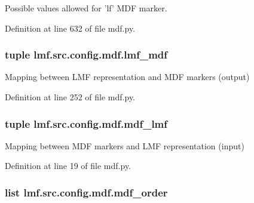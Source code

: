 Possible values allowed for 'lf' M\+D\+F marker. 



Definition at line 632 of file mdf.\+py.

\hypertarget{namespacelmf_1_1src_1_1config_1_1mdf_a78d8f1444783c1b86cbbd91f49a0cd4f}{
\subsubsection[{lmf\+\_\+mdf}]{\setlength{\rightskip}{0pt plus 5cm}tuple lmf.\+src.\+config.\+mdf.\+lmf\+\_\+mdf}}\label{namespacelmf_1_1src_1_1config_1_1mdf_a78d8f1444783c1b86cbbd91f49a0cd4f}


Mapping between L\+M\+F representation and M\+D\+F markers (output) 



Definition at line 252 of file mdf.\+py.

\hypertarget{namespacelmf_1_1src_1_1config_1_1mdf_a888cd9df8b9511d408e646dc404b5232}{
\subsubsection[{mdf\+\_\+lmf}]{\setlength{\rightskip}{0pt plus 5cm}tuple lmf.\+src.\+config.\+mdf.\+mdf\+\_\+lmf}}\label{namespacelmf_1_1src_1_1config_1_1mdf_a888cd9df8b9511d408e646dc404b5232}


Mapping between M\+D\+F markers and L\+M\+F representation (input) 



Definition at line 19 of file mdf.\+py.

\hypertarget{namespacelmf_1_1src_1_1config_1_1mdf_afe5efb72442beb65b5083335b744845c}{
\subsubsection[{mdf\+\_\+order}]{\setlength{\rightskip}{0pt plus 5cm}list lmf.\+src.\+config.\+mdf.\+mdf\+\_\+order}}\label{namespacelmf_1_1src_1_1config_1_1mdf_afe5efb72442beb65b5083335b744845c}


